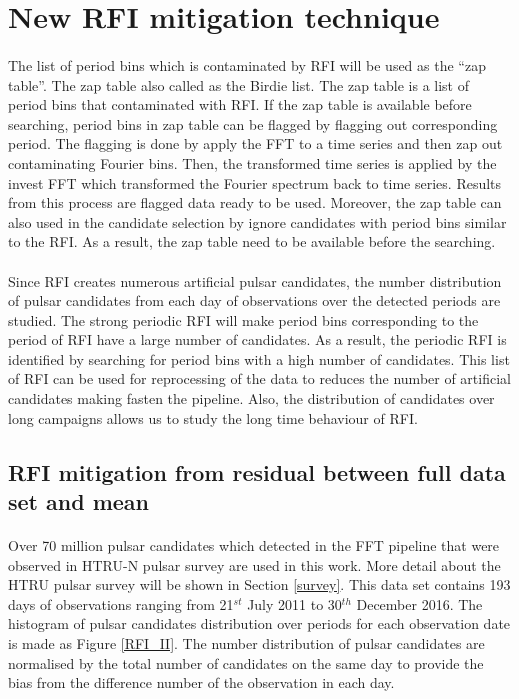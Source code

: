 \documentclass[thesis_msc.tex]{subfiles}
\begin{document}
\iffalse
\section{New RFI mitigation technique} \label{RFI}

     \paragraph{} The list of period bins which is contaminated by RFI will be used as the ``zap table''. The zap table also called as the Birdie list. The zap table is a list of period bins that contaminated with RFI. If the zap table is available before searching, period bins in zap table can be flagged by flagging out corresponding period. The flagging is done by apply the FFT to a time series and then zap out contaminating Fourier bins. Then, the transformed time series is applied by the invest FFT which transformed the Fourier spectrum back to time series. Results from this process are flagged data ready to be used. Moreover, the zap table can also used in the candidate selection by ignore candidates with period bins similar to the RFI. As a result, the zap table need to be available before the searching. %
     
     \paragraph{} Since RFI creates numerous artificial pulsar candidates, the number distribution of pulsar candidates from each day of observations over the detected periods are studied. The strong periodic RFI will make period bins corresponding to the period of RFI have a large number of candidates. As a result, the periodic RFI is identified by searching for period bins with a high number of candidates. This list of RFI can be used for reprocessing of the data to reduces the number of artificial candidates making fasten the pipeline. Also, the distribution of candidates over long campaigns allows us to study the long time behaviour of RFI. 

     \subsection{RFI mitigation from residual between full data set and mean}
     
    \paragraph{} Over 70 million pulsar candidates which detected in the FFT pipeline that were observed in HTRU-N pulsar survey are used in this work. More detail about the HTRU pulsar survey will be shown in Section \ref{survey}.  This data set contains 193 days of observations ranging from 21$^{st}$ July 2011 to 30$^{th}$ December 2016. The histogram of pulsar candidates distribution over periods for each observation date is made as Figure \ref{RFI_II}. The number distribution of pulsar candidates are normalised by the total number of candidates on the same day to provide the bias from the difference number of the observation in each day.
\end{document}
